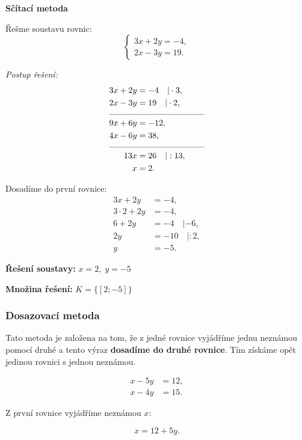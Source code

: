 \documentclass[12pt,a4paper]{article}
\begin{document}
\begin{examplebox}
\textbf{Sčítací metoda}

Řešme soustavu rovnic:
\[
\begin{cases}
3x + 2y = -4,\\
2x - 3y = 19.
\end{cases}
\]

\textit{Postup řešení:}
\begin{align*}
3x + 2y &= -4 \quad | \cdot 3,\\
2x - 3y &= 19 \quad | \cdot 2,\\[-4pt]
\multicolumn{2}{c}{\rule{4cm}{0.3pt}} \\[-2pt]
9x + 6y &= -12,\\
4x - 6y &= 38,\\[-4pt]
\multicolumn{2}{c}{\rule{4cm}{0.3pt}} \\[-2pt]
13x &= 26 \quad | :13,\\
x &= 2.
\end{align*}

Dosadíme do první rovnice:
\begin{align*}
3x + 2y &= -4,\\
3\cdot2 + 2y &= -4,\\
6 + 2y &= -4 \quad | -6,\\
2y &= -10 \quad | :2,\\
y &= -5.
\end{align*}

\textbf{Řešení soustavy:} \quad \(x = 2,\; y = -5\)

\medskip
\textbf{Množina řešení:} \quad \(K = \{[2;-5]\}\)
\end{examplebox}



\subsubsection*{Dosazovací metoda}

Tato metoda je založena na tom, že z jedné rovnice vyjádříme jednu neznámou pomocí druhé  
a tento výraz \textbf{dosadíme do druhé rovnice}. Tím získáme opět jedinou rovnici s jednou neznámou.

\begin{align*}
x - 5y &= 12,\\
x - 4y &= 15.
\end{align*}

Z první rovnice vyjádříme neznámou \(x\):

\[
x = 12 + 5y.
\]
\end{document}

